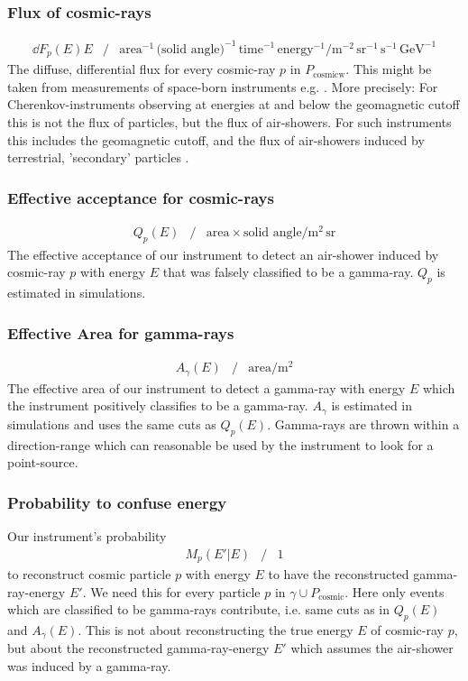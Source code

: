 \documentclass{article}%
\begin{document}
\subsubsection{Flux of cosmic-rays}
%
\begin{eqnarray*}
\dd{F_p(E)}{E} &/&
\text{area}^{-1}\,\text{(solid angle)}^{-1}\,\text{time}^{-1}\,\text{energy}^{-1} /
\text{m}^{-2}\,\text{sr}^{-1}\,\text{s}^{-1}\,\text{GeV}^{-1}
\end{eqnarray*}
The diffuse, differential flux for every cosmic-ray $p$ in $P_\text{cosmicw}$. This might be taken from measurements of space-born instruments e.g. \cite{aguilar2014precision,aguilar2015precision}.
%
More precisely: For Cherenkov-instruments observing at energies at and below the geomagnetic cutoff this is not the flux of particles, but the flux of air-showers.
%
For such instruments this includes the geomagnetic cutoff, and the flux of air-showers induced by terrestrial, 'secondary' particles \cite{lipari2002fluxes}.
%
\subsubsection{Effective acceptance for cosmic-rays}
\begin{eqnarray*}
Q_p(E) &/&
\text{area} \times{} \text{solid angle} /
\text{m}^{2}\,\text{sr}
\end{eqnarray*}
%
The effective acceptance of our instrument to detect an air-shower induced by cosmic-ray $p$ with energy $E$ that was falsely classified to be a gamma-ray.
%
$Q_p$ is estimated in simulations.
%
\subsubsection{Effective Area for gamma-rays}
\begin{eqnarray*}
A_\gamma(E) &/&
\text{area} /
\text{m}^{2}
\end{eqnarray*}
%
The effective area of our instrument to detect a gamma-ray with energy $E$ which the instrument positively classifies to be a gamma-ray.
%
$A_\gamma$ is estimated in simulations and uses the same cuts as $Q_p(E)$.
%
Gamma-rays are thrown within a direction-range which can reasonable be used by the instrument to look for a point-source.
%
\subsubsection{Probability to confuse energy}
%
Our instrument's probability
%
\begin{eqnarray*}
M_p(E' \vert E) &/& 1
\end{eqnarray*}
%
to reconstruct cosmic particle $p$ with energy $E$ to have the reconstructed gamma-ray-energy $E'$.
%
We need this for every particle $p$ in $\gamma \cup P_\text{cosmic}$.
%
Here only events which are classified to be gamma-rays contribute, i.e. same cuts as in $Q_p(E)$ and $A_\gamma(E)$.
%
This is not about reconstructing the true energy $E$ of cosmic-ray $p$, but about the reconstructed gamma-ray-energy $E'$ which assumes the air-shower was induced by a gamma-ray.
%
\end{document}
